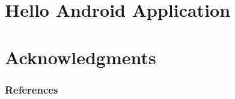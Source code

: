 \documentclass[ignorenonframetext,handout]{beamer}
\begin{document}
\section{Hello Android Application}
\label{sec:hello-android}



\section{Acknowledgments}



\nocite{*}
\mode*
\appendix
\backupbegin
\begin{frame}
    \frametitle{References}
    
    {\tiny }
\end{frame}
\backupend
\end{document}
